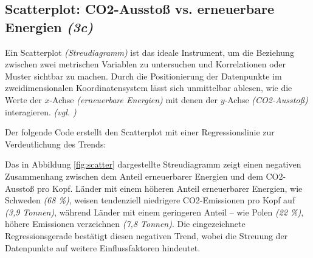 
\subsection{Scatterplot: \texorpdfstring{\acs{CO2}}{CO2}-Ausstoß \acs{vs.} erneuerbare Energien \texorpdfstring{\textit{(3c)}}{(3c)}}
\label{sec:3c}

Ein Scatterplot \textit{(Streudiagramm)} ist das ideale Instrument, um die Beziehung zwischen zwei metrischen Variablen zu untersuchen und Korrelationen oder Muster sichtbar zu machen. Durch die Positionierung der Datenpunkte im zweidimensionalen Koordinatensystem lässt sich unmittelbar ablesen, wie die Werte der \(x\)-Achse \textit{(erneuerbare Energien)} mit denen der \(y\)-Achse \textit{(\acs{CO2}-Ausstoß)} interagieren. \textit{(\acs{vgl.} \cite[29, 31, 53]{2})}

Der folgende Code erstellt den Scatterplot mit einer Regressionslinie zur Verdeutlichung des Trends: \pagebreak[3]

\begin{minipage}[t]{0.48\textwidth}
    
\end{minipage}
\hfill
\begin{minipage}[t]{0.48\textwidth}
    
\end{minipage}%
\vspace{-2\baselineskip}%
\captionsetup{hypcap=false}%
%
\label{lst:df-scatter}%

Das in Abbildung \ref{fig:scatter} dargestellte Streudiagramm zeigt einen negativen Zusammenhang zwischen dem Anteil erneuerbarer Energien und dem \acs{CO2}-Ausstoß pro Kopf. Länder mit einem höheren Anteil erneuerbarer Energien, wie Schweden \textit{(68 \%)}, weisen tendenziell niedrigere \acs{CO2}-Emissionen pro Kopf auf \textit{(3,9 Tonnen)}, während Länder mit einem geringeren Anteil – wie Polen \textit{(22 \%)}, höhere Emissionen verzeichnen \textit{(7,8 Tonnen)}. Die eingezeichnete Regressionsgerade bestätigt diesen negativen Trend, wobei die Streuung der Datenpunkte auf weitere Einflussfaktoren hindeutet.

